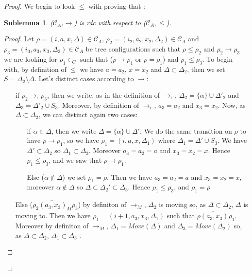 \documentclass[a4paper,10pt]{report}
\newtheorem{slm}{Sublemma}[lm]
\newcommand{\C}{\mathcal{C}_{A}}
\begin{document}
\begin{proof}
  We begin to look $\leq$ with proving that :
  \begin{slm}
    ($\C$,$\rightarrow$) is rdc with respect to ($\C,\leq$).
  \end{slm}
   \begin{proof}
   Let $\rho = (i,a,x,\Delta) \in \C$, $\rho_2 = (i_2,a_2,x_2,\Delta_2) \in \C$ and $\rho_3 = (i_3,a_3,x_3,\Delta_3) \in \C$ be tree configurations 
   such that $\rho \leq \rho_2$ and $\rho_2 \rightarrow \rho_3$ we are looking for $\rho_1 \in _C$ such that ($\rho \rightarrow \rho_1$ or $\rho = \rho_1$) and $\rho_1 \leq \rho_3$.
   To begin with, by definition of $\leq$ we have $a = a_2$, $x= x_2$ and $\Delta \subset \Delta_2$, then we set $S = \Delta_2 \setminus \Delta$. Let's distinct cases according to $\rightarrow$: 
   \begin{itemize}
    \item [if $\rho_2 \rightarrow_{\epsilon} \rho_3$,] 
    then we write, as in the definition of $\rightarrow_{\epsilon}$,  $\Delta_2 = \{\alpha \} \cup \Delta'_2$ and $\Delta_3 = \Delta'_2 \cup S_3$.
    Moreover, by definition of $\rightarrow_{\epsilon}$, $a_3 = a_2$ and $x_3 = x_2$.
    Now, as $\Delta \subset \Delta_2$, we can distinct again two cases:
      \begin{itemize}
	\item [if $\alpha \in \Delta$,] then we write $\Delta = \{\alpha \} \cup \Delta'$.  
	We do the same transition on $\rho$ to have $\rho \rightarrow \rho_1$, so we have $\rho_1 = (i,a,x,\Delta_1)$ where $\Delta_1 = \Delta' \cup S_3$. 
	We have $\Delta' \subset \Delta_2$ so $\Delta_1 \subset \Delta_3$.
	Moreover $a_3= a_2 = a$ and $x_3 = x_2 = x$.
	Hence $\rho_1 \leq \rho_3$, and we saw that $\rho \rightarrow \rho_1$.
	\item [Else ($\alpha \notin \Delta$)] we set $\rho_1 = \rho$. Then we have $a_3= a_2 = a$ and $x_3 = x_2 = x$, moreover $\alpha \notin \Delta $ so $\Delta \subset \Delta_2' \subset \Delta_3$.
	Hence $\rho_1 \leq \rho_3$, and $\rho_1 = \rho$ 
      \end{itemize}
     \item [Else ($\rho_2 \underrightarrow{(a_3,x_3)}_{M} \rho_3$)] by definiton of $\rightarrow_{M}$, $\Delta_2$ is moving so, as $\Delta \subset \Delta_2$, $\Delta$ is moving to.
     Then we have $\rho_1 = (i+1,a_3,x_3,\Delta_1)$ such that $\rho \underrightarrow{(a_3,x_3)} \rho_1$.
     Moreover by definiton of $\rightarrow_{M}$, $\Delta_1 = Move(\Delta)$ and $\Delta_3 = Move(\Delta_2)$ so, as $\Delta \subset \Delta_2$, $\Delta_1 \subset \Delta_3$ . 

\end{itemize}
\end{proof}
\end{proof}
\end{document}
